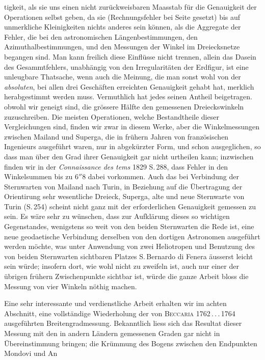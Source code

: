 %
tigkeit, als sie uns einen nicht zurückweisbaren Maasstab für die Genauigkeit der Operationen selbst geben, da sie (Rechnungsfehler bei Seite gesetzt) bis auf unmerkliche Kleinigkeiten nichts anderes sein können, als die Aggregate der Fehler, die bei den astronomischen Längenbestimmungen, den Azimuthalbestimmungen, und den Messungen der Winkel im Dreiecksnetze begangen sind. Man kann freilich diese Einflüsse nicht trennen, allein das Dasein des Gesammtfehlers, unabhängig von den Irregularitäten der Erdfigur, ist eine unleugbare Thatsache, wenn auch die Meinung, die man sonst wohl von der \textit{absoluten}, bei allen drei Geschäften erreichten Genauigkeit gehabt hat, merklich herabgestimmt werden muss. Vermuthlich hat jedes seinen Antheil beigetragen. obwohl wir geneigt sind, die grössere Hälfte den gemessenen Dreieckswinkeln zuzuschreiben. Die meisten Operationen, welche Bestandtheile dieser Vergleichungen sind, finden wir zwar in diesem Werke, aber die Winkelmessungen zwischen Mailand und Superga, die in frühern Jahren von französischen Ingenieurs ausgeführt waren, nur in abgekürzter Form, und schon ausgeglichen, so dass man über den Grad ihrer Genauigkeit gar nicht urtheilen kann; inzwischen finden wir in der \textit{Connaissance des tems} 1829 S.\,288, dass Fehler in den Winkelsummen bis zu \(6''8\) dabei vorkommen. Auch das bei Verbindung der Sternwarten von Mailand nach Turin, in Beziehung auf die Übertragung der Orientirung sehr wesentliche Dreieck, Superga, alte und neue Sternwarte von Turin (S.\,254) scheint nicht ganz mit der erforderlichen Genauigkeit gemessen zu sein. Es wäre sehr zu wünschen, dass zur Aufklärung dieses so wichtigen Gegenstandes, wenigstens so weit von den beiden Sternwarten die Rede ist, eine neue geodaetische Verbindung derselben von den dortigen Astronomen ausgeführt werden möchte, was unter Anwendung von zwei Heliotropen und Benutzung des von beiden Sternwarten sichtbaren Platzes S.\,Bernardo di Fenera äusserst leicht sein würde; insofern dort, wie wohl nicht zu zweifeln ist, auch nur einer der übrigen frühern Zwischenpunkte sichtbar ist, würde die ganze Arbeit bloss die Messung von vier Winkeln nöthig machen.

Eine sehr interessante und verdienstliche Arbeit erhalten wir im achten Abschnitt, eine vollständige Wiederholung der von \textsc{Beccaria} 1762\,.\,.\,.\,1764 ausgeführten Breitengradmessung. Bekanntlich liess sich das Resultat dieser Messung mit den in andern Ländern gemessenen Graden gar nicht in Übereinstimmung bringen; die Krümmung des Bogens zwischen den Endpunkten Mondovi und An%
